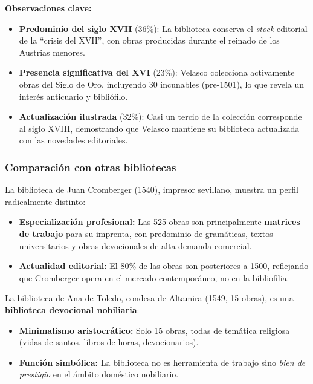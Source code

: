 \documentclass[12pt,a4paper]{article}
\begin{document}
\textbf{Observaciones clave:}

\begin{itemize}
\item \textbf{Predominio del siglo XVII} (36\%): La biblioteca conserva el \textit{stock} editorial de la \enquote{crisis del XVII}, con obras producidas durante el reinado de los Austrias menores.

\item \textbf{Presencia significativa del XVI} (23\%): Velasco colecciona activamente obras del Siglo de Oro, incluyendo 30 incunables (pre-1501), lo que revela un interés anticuario y bibliófilo.

\item \textbf{Actualización ilustrada} (32\%): Casi un tercio de la colección corresponde al siglo XVIII, demostrando que Velasco mantiene su biblioteca actualizada con las novedades editoriales.
\end{itemize}

\subsubsection{Comparación con otras bibliotecas}

La biblioteca de Juan Cromberger (1540), impresor sevillano, muestra un perfil radicalmente distinto:

\begin{itemize}
\item \textbf{Especialización profesional:} Las 525 obras son principalmente \textbf{matrices de trabajo} para su imprenta, con predominio de gramáticas, textos universitarios y obras devocionales de alta demanda comercial.

\item \textbf{Actualidad editorial:} El 80\% de las obras son posteriores a 1500, reflejando que Cromberger opera en el mercado contemporáneo, no en la bibliofilia.
\end{itemize}

La biblioteca de Ana de Toledo, condesa de Altamira (1549, 15 obras), es una \textbf{biblioteca devocional nobiliaria}:

\begin{itemize}
\item \textbf{Minimalismo aristocrático:} Solo 15 obras, todas de temática religiosa (vidas de santos, libros de horas, devocionarios).

\item \textbf{Función simbólica:} La biblioteca no es herramienta de trabajo sino \textit{bien de prestigio} en el ámbito doméstico nobiliario.
\end{itemize}
\end{document}
